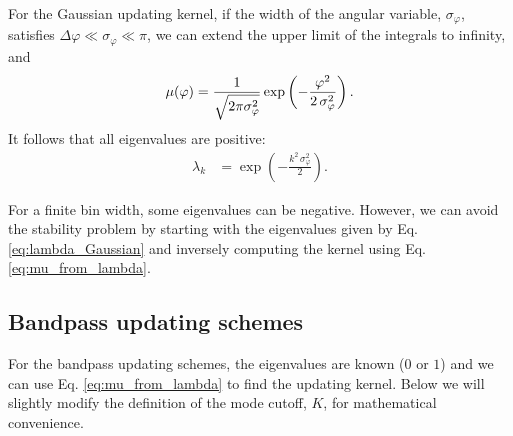 \documentclass[reprint, superscriptaddress, floatfix]{revtex4-1}
\begin{document}
For the Gaussian updating kernel,
if the width of the angular variable, $\sigma_\varphi$,
satisfies $\Delta \varphi \ll \sigma_\varphi \ll \pi$,
we can extend
the upper limit of the integrals
to infinity, and
%
\begin{equation}
  \mu(\varphi)
  =
  \frac{            1            }
       { \sqrt{ 2 \pi \sigma_\varphi^2 } }
  \exp\left(
        -\frac{   \varphi^2   }
              { 2 \, \sigma_\varphi^2 }
      \right)
  .
\notag
\end{equation}
%
%
It follows that all eigenvalues are positive\cite{bussi2006}:
%
\begin{align}
  \lambda_k
  &=
  \exp\left(
        -\frac{ k^2 \, \sigma_\varphi^2 }
              {           2             }
      \right)
  .
\label{eq:lambda_Gaussian}
\end{align}

For a finite bin width,
some eigenvalues can be negative.
However, we can avoid the stability problem
by starting with the eigenvalues given by Eq. \eqref{eq:lambda_Gaussian}
and inversely computing the kernel using Eq. \eqref{eq:mu_from_lambda}.



\subsection{\label{sec:homo_bandpass}
Bandpass updating schemes}



For the bandpass updating schemes,
the eigenvalues are known ($0$ or $1$) and
we can use Eq. \eqref{eq:mu_from_lambda}
to find the updating kernel.
%
Below we will slightly modify the definition of
the mode cutoff, $K$,
for mathematical convenience.
\end{document}
